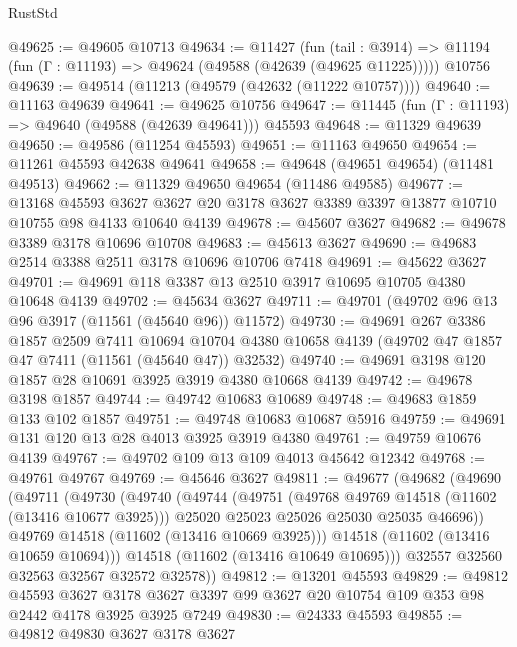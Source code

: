 \begin{lexlean}{RustStd}
\begin{coremodule}
@49625 := @49605 @10713
@49634 := @11427
    (fun (tail : @3914) => @11194 (fun (Γ : @11193) => @49624 (@49588 (@42639 (@49625 @11225)))))
    @10756
@49639 := @49514 (@11213 (@49579 (@42632 (@11222 @10757))))
@49640 := @11163 @49639
@49641 := @49625 @10756
@49647 := @11445 (fun (Γ : @11193) => @49640 (@49588 (@42639 @49641))) @45593
@49648 := @11329 @49639
@49650 := @49586 (@11254 @45593)
@49651 := @11163 @49650
@49654 := @11261 @45593 @42638 @49641
@49658 := @49648 (@49651 @49654) (@11481 @49513)
@49662 := @11329 @49650 @49654 (@11486 @49585)
@49677 := @13168
    @45593
    @3627
    @3627
    @20
    @3178
    @3627
    @3389
    @3397
    @13877
    @10710
    @10755
    @98
    @4133
    @10640
    @4139
@49678 := @45607 @3627
@49682 := @49678 @3389 @3178 @10696 @10708
@49683 := @45613 @3627
@49690 := @49683 @2514 @3388 @2511 @3178 @10696 @10706 @7418
@49691 := @45622 @3627
@49701 := @49691 @118 @3387 @13 @2510 @3917 @10695 @10705 @4380 @10648 @4139
@49702 := @45634 @3627
@49711 := @49701 (@49702 @96 @13 @96 @3917 (@11561 (@45640 @96)) @11572)
@49730 := @49691
    @267
    @3386
    @1857
    @2509
    @7411
    @10694
    @10704
    @4380
    @10658
    @4139
    (@49702 @47 @1857 @47 @7411 (@11561 (@45640 @47)) @32532)
@49740 := @49691 @3198 @120 @1857 @28 @10691 @3925 @3919 @4380 @10668 @4139
@49742 := @49678 @3198 @1857
@49744 := @49742 @10683 @10689
@49748 := @49683 @1859 @133 @102 @1857
@49751 := @49748 @10683 @10687 @5916
@49759 := @49691 @131 @120 @13 @28 @4013 @3925 @3919 @4380
@49761 := @49759 @10676 @4139
@49767 := @49702 @109 @13 @109 @4013 @45642 @12342
@49768 := @49761 @49767
@49769 := @45646 @3627
@49811 := @49677
    (@49682
      (@49690
        (@49711
          (@49730
            (@49740
              (@49744
                (@49751
                  (@49768 @49769 @14518 (@11602 (@13416 @10677 @3925)))
                  @25020
                  @25023
                  @25026
                  @25030
                  @25035
                  @46696))
              @49769
              @14518
              (@11602 (@13416 @10669 @3925)))
            @14518
            (@11602 (@13416 @10659 @10694)))
          @14518
          (@11602 (@13416 @10649 @10695)))
        @32557
        @32560
        @32563
        @32567
        @32572
        @32578))
@49812 := @13201 @45593
@49829 := @49812
    @45593
    @3627
    @3178
    @3627
    @3397
    @99
    @3627
    @20
    @10754
    @109
    @353
    @98
    @2442
    @4178
    @3925
    @3925
    @7249
@49830 := @24333 @45593
@49855 := @49812
    @49830
    @3627
    @3178
    @3627

\end{coremodule}
\end{lexlean}
